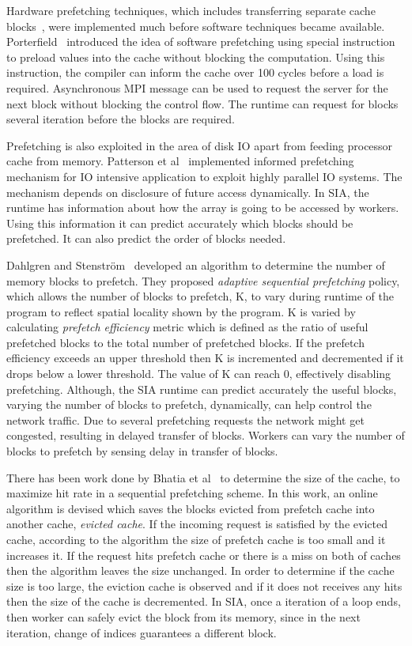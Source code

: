 Hardware prefetching techniques, which includes transferring separate
cache blocks~\cite{Smith1978}, were implemented much before software techniques became
available. Porterfield~\cite{Porterfield1989} introduced the idea of software prefetching
using special instruction to preload values into the cache without blocking the
computation. Using this instruction, the compiler can inform the cache over 100
cycles before a load is required. Asynchronous MPI message can be used to request
the server for the next block without blocking the control flow. The runtime can
request for blocks several iteration before the blocks are required.

Prefetching is also exploited in the area of disk IO apart from feeding processor cache
from memory. Patterson et al~\cite{Patterson1994} implemented informed prefetching
mechanism for IO intensive application to exploit highly parallel IO systems. The
mechanism depends on disclosure of future access dynamically. In SIA, the runtime
has information about how the array is going to be accessed by workers. Using this
information it can predict accurately which blocks should be prefetched. It can
also predict the order of blocks needed.

Dahlgren and Stenström~\cite{Dahlgren1993} developed an algorithm to determine the
number of memory blocks to prefetch. They proposed
\textit{adaptive sequential prefetching} policy, which allows the number of blocks
to prefetch, K, to vary during runtime of the program to reflect spatial locality
shown by the program. K is varied by calculating \textit{prefetch efficiency} metric
which is defined as the ratio of useful prefetched blocks to the total number of
prefetched blocks. If the prefetch efficiency exceeds an upper threshold then K is
incremented and decremented if it drops below a lower threshold. The value of K
can reach 0, effectively disabling prefetching. Although, the SIA runtime can
predict accurately the useful blocks, varying the number of blocks to prefetch, dynamically,
can help control the network traffic. Due to several prefetching requests
the network might get congested, resulting in delayed transfer of blocks. Workers
can vary the number of blocks to prefetch by sensing delay in transfer of blocks.

There has been work done by Bhatia et al~\cite{Bhatia2010} to determine the size of
the cache, to maximize hit rate in a sequential prefetching scheme. In this work, an
online algorithm is devised which saves the blocks evicted from prefetch cache
into another cache, \textit{evicted cache}. If the incoming request is satisfied
by the evicted cache, according to the algorithm the size of prefetch cache is too
small and it increases it. If the request hits prefetch cache or there is a miss
on both of caches then the algorithm leaves the size unchanged. In order to determine if
the cache size is too large, the eviction cache is observed and if it does not
receives any hits then the size of the cache is decremented. In SIA, once a
iteration of a loop ends, then worker can safely evict the block from its memory,
since in the next iteration, change of indices guarantees a different block.

